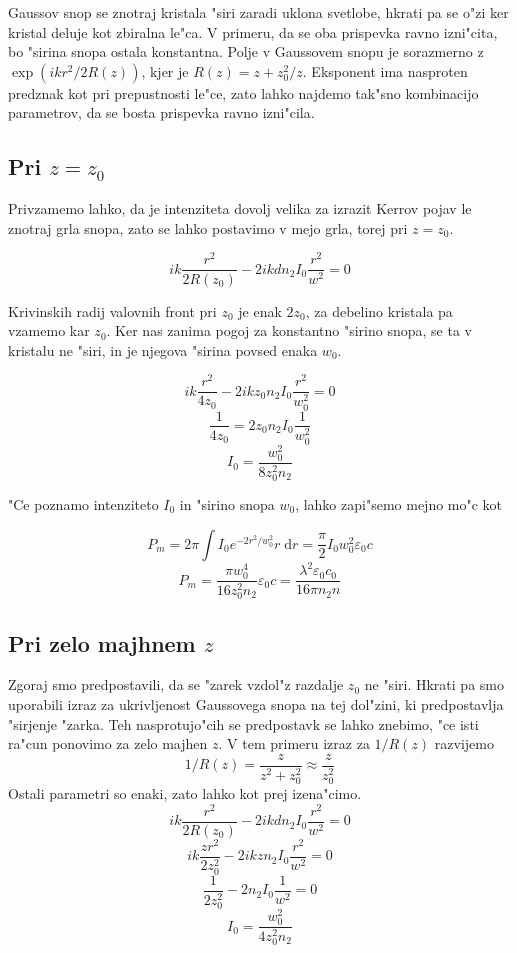 \documentclass[a4paper,10pt]{article}
\begin{document}
Gaussov snop se znotraj kristala "siri zaradi uklona svetlobe, hkrati pa se o"zi ker kristal deluje kot zbiralna le"ca. V primeru, da se oba prispevka ravno izni"cita, bo "sirina snopa ostala konstantna. Polje v Gaussovem snopu je sorazmerno z $\exp(ikr^2/2R(z))$, kjer je $R(z) = z + z_0^2/z$. Eksponent ima nasproten predznak kot pri prepustnosti le"ce, zato lahko najdemo tak"sno kombinacijo parametrov, da se bosta prispevka ravno izni"cila. 

\subsection{Pri $z=z_0$}
Privzamemo lahko, da je intenziteta dovolj velika za izrazit Kerrov pojav le znotraj grla snopa, zato se lahko postavimo v mejo grla, torej pri $z=z_0$. 

$$ik\frac{r^2}{2R(z_0)} -2ikdn_2I_0\frac{r^2}{w^2} = 0$$

Krivinskih radij valovnih front pri $z_0$ je enak $2z_0$, za debelino kristala pa vzamemo kar $z_0$. Ker nas zanima pogoj za konstantno "sirino snopa, se ta v kristalu ne "siri, in je njegova "sirina povsed enaka $w_0$. 

$$ik\frac{r^2}{4z_0} - 2ikz_0n_2I_0\frac{r^2}{w_0^2} = 0$$
$$\frac{1}{4z_0} = 2z_0n_2I_0\frac{1}{w_0^2}$$
$$I_0 = \frac{w_0^2}{8z_0^2n_2}$$

"Ce poznamo intenziteto $I_0$ in "sirino snopa $w_0$, lahko zapi"semo mejno mo"c kot

$$P_m = 2\pi\int I_0 e^{-2r^2/w_0^2} r\;\mathrm{d}r = \frac{\pi}{2} I_0 w_0^2 \varepsilon_0c$$
$$P_m = \frac{\pi w_0^4}{16z_0^2n_2}\varepsilon_0c = \frac{\lambda^2\varepsilon_0 c_0}{16\pi n_2n}$$

\subsection{Pri zelo majhnem $z$}

Zgoraj smo predpostavili, da se "zarek vzdol"z razdalje $z_0$ ne "siri. Hkrati pa smo uporabili izraz za ukrivljenost Gaussovega snopa na tej dol"zini, ki predpostavlja "sirjenje "zarka. Teh nasprotujo"cih se predpostavk se lahko znebimo, "ce isti ra"cun ponovimo za zelo majhen $z$. V tem primeru izraz za $1/R(z)$ razvijemo
$$1/R(z) = \frac{z}{z^2+z_0^2} \approx \frac{z}{z_0^2}$$
Ostali parametri so enaki, zato lahko kot prej izena"cimo. 
$$ik\frac{r^2}{2R(z_0)} -2ikdn_2I_0\frac{r^2}{w^2} = 0$$
$$ik\frac{zr^2}{2z_0^2} -2ikzn_2I_0\frac{r^2}{w^2} = 0$$
$$\frac{1}{2z_0^2} -2n_2I_0\frac{1}{w^2} = 0$$
$$I_0 = \frac{w_0^2}{4z_0^2n_2}$$
\end{document}
